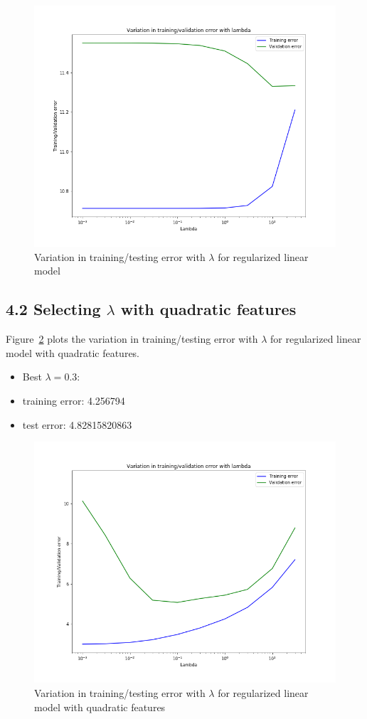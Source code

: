 \documentclass[english,11pt]{article}
\begin{document}
\begin{figure}[ht]
\centering
\includegraphics[width=.5\textwidth]{../hw1/part2/fig4_linear_lambda_10.png}
\caption{Variation in training/testing error with $\lambda$ for regularized linear model}
\label{fig:4_1}
\end{figure}



\subsection*{ 4.2 Selecting $\lambda$ with quadratic features}
Figure~\ref{fig:4_2} plots the variation in training/testing error with $\lambda$ for regularized linear model with quadratic features.
\begin{itemize}
\item Best $\lambda=0.3$:
\item training error:  4.256794
\item test error: 4.82815820863
\end{itemize}

\begin{figure}[ht]
\centering
\includegraphics[width=.5\textwidth]{../hw1/part2/fig4_quadratic_lambda_03.png}
\caption{Variation in training/testing error with $\lambda$ for regularized linear model with quadratic features}
\label{fig:4_2}
\end{figure}
\end{document}
